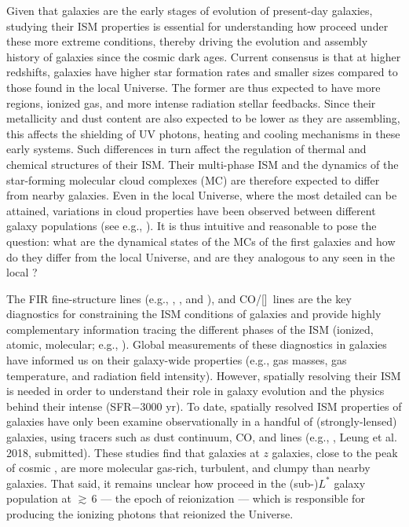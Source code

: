 \documentclass[iop]{emulateapj}
\begin{document}
Given that \highz galaxies are the early stages of evolution of present-day galaxies, studying their ISM properties is essential for understanding how \SF proceed under these more extreme conditions, thereby driving the evolution and assembly history of galaxies 
since the cosmic dark ages.
Current consensus is that at higher redshifts, galaxies have higher 
star formation rates \citep[SFR; ][]{Behroozi13b, Sparre15a, Maiolino15a, Dunlop17a} and 
smaller sizes \citep[e.g.,][]{Bouwens11a, Ono13a} compared to those found in the local Universe.
The former are thus expected to have more  regions, ionized gas, and more intense radiation stellar feedbacks. 
Since their metallicity and dust content are also expected to be lower as they are assembling, 
this affects the shielding of UV photons, heating and cooling mechanisms in these early systems. Such differences in turn 
affect the regulation of thermal and chemical structures of their ISM. 
Their multi-phase ISM and the dynamics of the star-forming molecular cloud complexes (MC)
are therefore expected to differ from nearby galaxies.
Even in the local Universe, where the most detailed \obs can be attained, variations in cloud properties have been 
observed between different galaxy populations (see e.g., \citealt{Hughes10a, Hughes13b}).
It is thus intuitive and reasonable to pose the question: what are the dynamical states of the MCs of the first galaxies and 
how do they differ from the local Universe, and are they analogous to any seen in the local \galpop?
% 

The FIR fine-structure lines (e.g., \cii, \nii, and \oiii), and CO/[\ci]~lines are the key diagnostics for
constraining the ISM conditions of galaxies and
provide highly complementary information tracing the different phases of the ISM (ionized,
atomic, molecular; e.g., \citealt{Scoville74a, Rubin85a, Malhotra01a}).
Global measurements of these diagnostics in \highz galaxies
have informed us on their galaxy-wide properties (e.g.,
gas masses, gas temperature, and radiation field intensity).
However, spatially resolving their ISM is needed in order to understand their role in galaxy evolution and
the physics behind their intense \SF (SFR$-$3000\,\Msun\,yr\pmOne).
To date, spatially resolved ISM properties of \highz galaxies
have only been examine observationally in a handful of (strongly-lensed)
galaxies, using tracers such as
dust continuum, CO, and \cii lines (e.g., \citealt{Swinbank11a, Hodge15a, Ferkinhoff15a, Hodge16a},
Leung et al. 2018, submitted).
These studies find that galaxies at $z$ galaxies, close to the peak of cosmic \SF, are more
molecular gas-rich, turbulent, and clumpy than nearby galaxies.
That said, it remains unclear how \SF proceed in the (sub-)$L^*$ galaxy population at \z$\gtrsim$\,6 --- 
the epoch of reionization  ---
which is responsible for producing the
ionizing photons that reionized the Universe.
\end{document}
